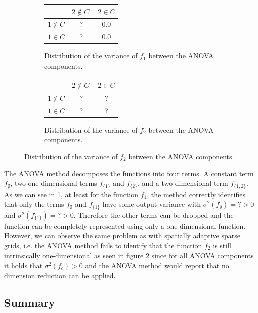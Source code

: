 \documentclass[
  a4paper,  %
  twoside,  %
  bibliography=totoc,
  headsepline,
  cleardoublepage=empty,
  parskip=half,
  draft=false
]{scrbook}
\begin{document}
\begin{mdframed}[style=style]
\vspace{2.5mm}
\begin{figure}[H]
\begin{subfigure}{.50\textwidth}
  \centering
  \begin{tabular}{ l c c }
\hline \hline
& $2 \notin C~$ & $2 \in C$ \\
\hline
$1 \notin C$ & ? & 0.0\\
$1 \in C$ & ? & 0.0\\
\end{tabular}
  \caption{Distribution of the variance of $f_1$ between the ANOVA components.}
  \label{fig:anova_f1}
\end{subfigure}
\begin{subfigure}{.49\textwidth}
  \centering
  \begin{tabular}{ l c c }
\hline \hline
& $2 \notin C~$ & $2 \in C$ \\
\hline
$1 \notin C$ & ? & ?\\
$1 \in C$ & ? & ?\\
\end{tabular}
  \caption{Distribution of the variance of $f_2$ between the ANOVA components.}
  \label{fig:anova_f2}
\end{subfigure}
\delimit
{}
\label{fig:anova}
\end{figure}
\end{mdframed}

The ANOVA method decomposes the functions into four terms.
A constant term $f_\emptyset$, two one-dimensional terms $f_{\{1\}}$ and $f_{\{2\}}$, and a two dimensional term $f_{\{1,2\}}$.
As we can see in \cref{fig:anova_f1}, at least for the function $f_1$, the method correctly identifies that only the terms $f_\emptyset$ and $f_{\{1\}}$ have some output variance with $\sigma^2(f_\emptyset)=? > 0$ and $\sigma^2(f_{\{1\}})=? > 0$.
Therefore the other terms can be dropped and the function can be completely represented using only a one-dimensional function.
However, we can observe the same problem as with spatially adaptive sparse grids, i.e. the ANOVA method fails to identify that the function $f_2$ is still intrinsically one-dimensional as seen in figure \cref{fig:anova_f2} since for all ANOVA components it holds that $\sigma^2(f_{c}) > 0$ and the ANOVA method would report that no dimension reduction can be applied.

\subsection{Summary}
\end{document}
